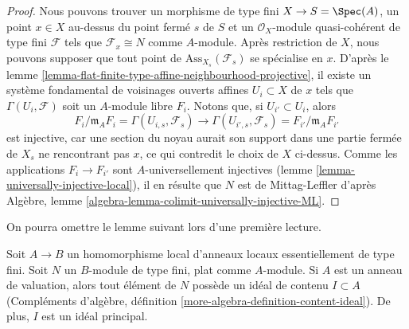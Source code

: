 \begin{proof}
Nous pouvons trouver un morphisme de type fini $X \to S = \Spec(A)$,
un point $x \in X$ au-dessus du point fermé $s$ de $S$ et un
$\mathcal{O}_X$-module quasi-cohérent de type fini $\mathcal{F}$ tels que
$\mathcal{F}_x \cong N$ comme $A$-module. Après restriction de $X$,
nous pouvons supposer que tout point de $\text{Ass}_{X_s}(\mathcal{F}_s)$ se spécialise
en $x$. D'après le
lemme \ref{lemma-flat-finite-type-affine-neighbourhood-projective},
il existe un système fondamental de voisinages ouverts affines
$U_i \subset X$ de $x$ tels que $\Gamma(U_i, \mathcal{F})$ soit
un $A$-module libre $F_i$. Notons que, si $U_{i'} \subset U_i$, alors
$$
F_i/\mathfrak m_AF_i = \Gamma(U_{i, s}, \mathcal{F}_s)
\longrightarrow
\Gamma(U_{i', s}, \mathcal{F}_s) = F_{i'}/\mathfrak m_AF_{i'}
$$
est injective, car une section du noyau aurait son support dans
une partie fermée de $X_s$ ne rencontrant pas $x$, ce qui contredit
le choix de $X$ ci-dessus. Comme les applications $F_i \to F_{i'}$ sont
$A$-universellement injectives (lemme \ref{lemma-universally-injective-local}),
il en résulte que $N$ est
de Mittag-Leffler d'après
Algèbre, lemme \ref{algebra-lemma-colimit-universally-injective-ML}.
\end{proof}

\noindent
On pourra omettre le lemme suivant lors d'une première lecture.

\begin{lemma}
\label{lemma-flat-finite-type-local-valuation-ring-has-content}
Soit $A \to B$ un homomorphisme local d'anneaux locaux essentiellement de
type fini. Soit $N$ un $B$-module de type fini, plat comme $A$-module.
Si $A$ est un anneau de valuation, alors tout élément de $N$ possède un idéal de contenu
$I \subset A$ (Compléments d'algèbre, définition
\ref{more-algebra-definition-content-ideal}). De plus, $I$ est un
idéal principal.
\end{lemma}

